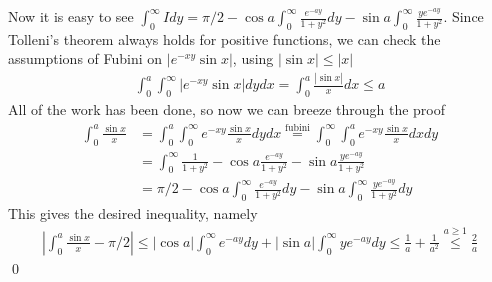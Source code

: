 \documentclass{article}
\theoremstyle{definition}
\newcommand{\abs}[1]{\left\vert#1\right\vert}
\begin{document}
    Now it is easy to see \(\int_0^\infty Idy = \pi/2 - \cos a \int_0^\infty \frac{e^{-ay}}{1 + y^2}dy - \sin a \int_0^\infty \frac{ye^{-ay}}{1+y^2}\). Since Tolleni's theorem always holds for positive functions, we can check the assumptions of Fubini on \(\abs{e^{-xy}\sin x}\), using \(\abs{\sin x} \leq \abs{x}\)
    \begin{align*}
        \int_0^a \int_0^\infty \abs{e^{-xy}\sin x}dydx = \int_0^a \frac{\abs{\sin x}}{x}dx \leq a
    \end{align*}
    All of the work has been done, so now we can breeze through the proof
    \begin{align*}
        \int_0^a \frac{\sin x}{x} &= \int_0^a \int_0^\infty e^{-xy}\frac{\sin x}{x} dydx \overset{\text{fubini}}{=} \int_0^\infty\int_0^a e^{-xy}\frac{\sin x}{x} dxdy \\
        &= \int_0^\infty \frac{1}{1 + y^2} - \cos a \frac{e^{-ay}}{1 + y^2} - \sin a \frac{ye^{-ay}}{1+y^2} \\ &= \pi/2 - \cos a \int_0^\infty\frac{e^{-ay}}{1 + y^2}dy - \sin a \int_0^\infty \frac{ye^{-ay}}{1+y^2}dy
    \end{align*}
    This gives the desired inequality, namely
    \begin{align*}
        \abs{\int_0^a \frac{\sin x}{x} - \pi/2} \leq \abs{\cos a}\int_0^\infty e^{-ay}dy + \abs{\sin a} \int_0^\infty  ye^{-ay}dy \leq \frac{1}{a} + \frac{1}{a^2} \overset{a \geq 1}{\leq} \frac{2}{a}
    \end{align*} \qed
\end{document}
